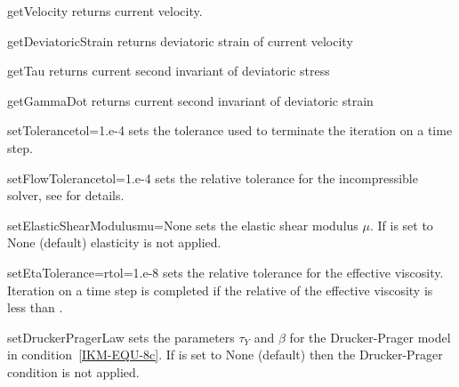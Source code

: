 \begin{methoddesc}[IncompressibleIsotropicFlowCartesian]{getVelocity}{}
returns current velocity.
\end{methoddesc}

\begin{methoddesc}[IncompressibleIsotropicFlowCartesian]{getDeviatoricStrain}{}
returns deviatoric strain of current velocity
\end{methoddesc}

\begin{methoddesc}[IncompressibleIsotropicFlowCartesian]{getTau}{}
returns current second invariant of deviatoric stress
\end{methoddesc}

\begin{methoddesc}[IncompressibleIsotropicFlowCartesian]{getGammaDot}{}
returns current second invariant of deviatoric strain
\end{methoddesc}

\begin{methoddesc}[IncompressibleIsotropicFlowCartesian]{setTolerance}{tol=1.e-4}
sets the tolerance used to terminate the iteration on a time step.
\end{methoddesc}

\begin{methoddesc}[IncompressibleIsotropicFlowCartesian]{setFlowTolerance}{tol=1.e-4}
sets the relative tolerance for the incompressible solver, see
 for details.
\end{methoddesc}

\begin{methoddesc}[IncompressibleIsotropicFlowCartesian]{setElasticShearModulus}{mu=None}
sets the elastic shear modulus $\mu$. If  is set to None (default)
elasticity is not applied.
\end{methoddesc}

\begin{methoddesc}[IncompressibleIsotropicFlowCartesian]{setEtaTolerance=}{rtol=1.e-8}
sets the relative tolerance for the effective viscosity. Iteration on a time
step is completed if the relative of the effective viscosity is less than
.
\end{methoddesc}

\begin{methoddesc}[IncompressibleIsotropicFlowCartesian]{setDruckerPragerLaw}
{}
sets the parameters $\tau_{Y}$ and $\beta$ for the Drucker-Prager model in
condition~\ref{IKM-EQU-8c}. If  is set to None (default) then the
Drucker-Prager condition is not applied.
\end{methoddesc}

